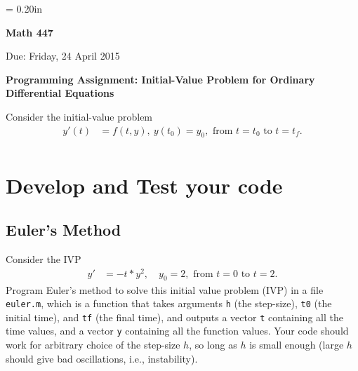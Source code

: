 \documentclass[final,11pt]{article}
\begin{document}
\normalsize
\baselineskip = 0.20in

\Large

\begin{center}
{\bf Math 447 } 
\end{center}
\begin{center}
 Due: Friday, 24 April 2015 \\

\end{center}
\begin{center}
{\bf Programming Assignment: Initial-Value Problem for Ordinary
Differential Equations} 
\end{center}


Consider the initial-value problem
\begin{equation}\label{eq1}
  \begin{aligned}
    y'(t) &= f(t,y), ~y(t_0)  = y_0, \text{ from } t = t_0 \text{ to } t = t_f.\\
    \end{aligned}
\end{equation}

\section{Develop and Test your code}
\subsection{Euler's Method}
Consider the IVP 
\begin{align*}
y' &= -t*y^2, \quad y_0=2, \text{ from } t = 0 \text{ to } t = 2.
\end{align*}
Program Euler's method to solve this initial value problem (IVP) in a file \texttt{euler.m}, which is a function that takes arguments \texttt{h} (the step-size), \texttt{t0} (the initial time), and \texttt{tf} (the final time), and outputs a vector \texttt{t} containing all the time values, and a vector \texttt{y} containing all the function values.  Your code should work for arbitrary choice of 
the step-size $h$, so long as $h$ is small enough (large $h$ should give bad oscillations, i.e., instability).  
\end{document}
